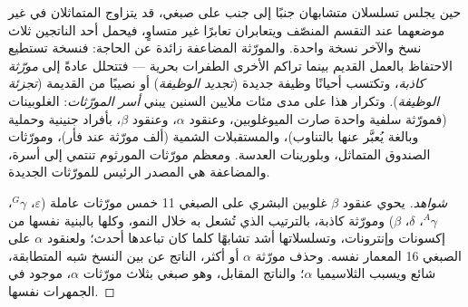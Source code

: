 \begin{proposition}\label{prop:b2:genome-diversification:duplication}
حين يجلس تسلسلان متشابهان جنبًا إلى جنب على صبغي، قد يتزاوج
المتماثلان في غير موضعهما عند التقسم المنصّف ويتعابران تعابرًا غير
متساوٍ، فيحمل أحد الناتجين ثلاث نسخ والآخر نسخة واحدة. والمورّثة
المضاعفة زائدة عن الحاجة: فنسخة تستطيع الاحتفاظ بالعمل القديم بينما
تراكم الأخرى الطفرات بحرية --- فتتحلل عادةً إلى \emph{مورّثة كاذبة}،
وتكتسب أحيانًا وظيفة جديدة (\emph{تجديد الوظيفة}) أو نصيبًا من
القديمة (\emph{تجزئة الوظيفة}). وتكرار هذا على مدى مئات ملايين
السنين يبني \emph{أسر المورّثات}: الغلوبينات (فمورّثة سلفية واحدة
صارت الميوغلوبين، وعنقود $\alpha$، وعنقود $\beta$، بأفراد جنينية
وحملية وبالغة يُعبَّر عنها بالتناوب)، والمستقبلات الشمية (ألف مورّثة
عند فأر)، ومورّثات الصندوق المتماثل، وبلورينات العدسة. ومعظم مورّثات
المورثوم تنتمي إلى أسرة، والمضاعفة هي المصدر الرئيس للمورّثات
الجديدة.
\end{proposition}
\begin{proof}[شواهد]
يحوي عنقود $\beta$ غلوبين البشري على الصبغي 11 خمس مورّثات عاملة
($\varepsilon$، $^{G}\gamma$، $^{A}\gamma$،
$\delta$، $\beta$) ومورّثة كاذبة، بالترتيب الذي تُشعل به خلال النمو،
وكلها بالبنية نفسها من إكسونات وإنترونات، وتسلسلاتها أشد تشابهًا
كلما كان تباعدها أحدث؛ ولعنقود $\alpha$ على الصبغي 16 المعمار نفسه.
وحذف مورّثة $\alpha$ أو أكثر، الناتج عن  بين النسخ
شبه المتطابقة، شائع ويسبب الثلاسيميا $\alpha$؛ والناتج المقابل، وهو
صبغي بثلاث مورّثات $\alpha$، موجود في الجمهرات نفسها.
\end{proof}

